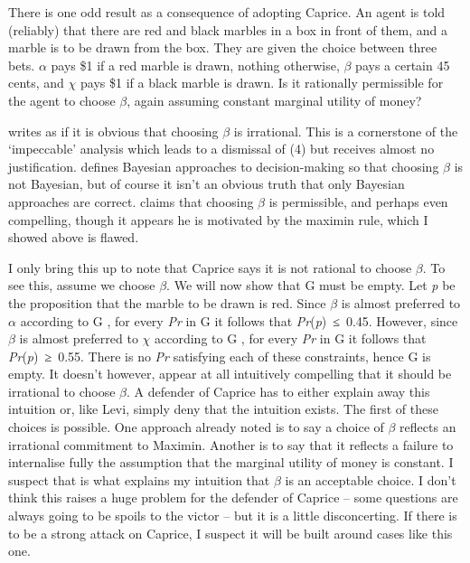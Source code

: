There is one odd result as a consequence of adopting Caprice. An agent
is told (reliably) that there are red and black marbles in a box in
front of them, and a marble is to be drawn from the box. They are given
the choice between three bets. $\alpha$ pays \$1 if a red marble is drawn,
nothing otherwise, $\beta$ pays a certain 45 cents, and $\chi$ pays \$1 if a black
marble is drawn. Is it rationally permissible for the agent to choose $\beta$,
again assuming constant marginal utility of money?

\citet{Levi1974} writes as if it is obvious that choosing $\beta$ is irrational.
This is a cornerstone of the `impeccable' analysis which leads to a
dismissal of (4) but receives almost no justification. \citet{Jeffrey1983}
defines Bayesian approaches to decision-making so that choosing $\beta$ is not
Bayesian, but of course it isn't an obvious truth that only Bayesian
approaches are correct. \citet{Dempster1988} claims that choosing $\beta$ is
permissible, and perhaps even compelling, though it appears he is
motivated by the maximin rule, which I showed above is flawed.

I only bring this up to note that Caprice says it is not rational to
choose $\beta$. To see this, assume we choose $\beta$. We will now show that G must
be empty. Let \emph{p} be the proposition that the marble to be drawn is
red. Since $\beta$ is almost preferred to $\alpha$ according to G , for every
\emph{Pr} in G it follows that \emph{Pr}(\emph{p})~≤~0.45. However,
since $\beta$ is almost preferred to $\chi$ according to G , for every \emph{Pr} in
G it follows that \emph{Pr}(\emph{p})~≥~0.55. There is no \emph{Pr}
satisfying each of these constraints, hence G is empty. It doesn't
however, appear at all intuitively compelling that it should be
irrational to choose $\beta$. A defender of Caprice has to either explain away
this intuition or, like Levi, simply deny that the intuition exists. The
first of these choices is possible. One approach already noted is to say
a choice of $\beta$ reflects an irrational commitment to Maximin. Another is
to say that it reflects a failure to internalise fully the assumption
that the marginal utility of money is constant. I suspect that is what
explains my intuition that $\beta$ is an acceptable choice. I don't think this
raises a huge problem for the defender of Caprice -- some questions are
always going to be spoils to the victor -- but it is a little
disconcerting. If there is to be a strong attack on Caprice, I suspect
it will be built around cases like this one.

